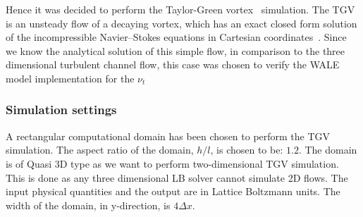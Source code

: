 Hence it was decided to perform the Taylor-Green vortex~\cite{taylor:green} simulation. The TGV is an unsteady flow of a decaying vortex, which has an exact closed form solution of the incompressible Navier–Stokes equations in Cartesian coordinates~\cite{wiki:tgv}. Since we know the analytical solution of this simple flow, in comparison to the three dimensional turbulent channel flow, this case was chosen to verify the WALE model implementation for the $\nu_t$

\subsubsection{Simulation settings}

A rectangular computational domain has been chosen to perform the TGV simulation. The aspect ratio of the domain, $h/l$, is chosen to be: $1.2$. The domain is of Quasi 3D type as we want to perform two-dimensional TGV simulation. This is done as any three dimensional LB solver cannot simulate 2D flows. The input physical quantities and the output are in Lattice Boltzmann units. The width of the domain, in y-direction, is $4\Delta x$. 

